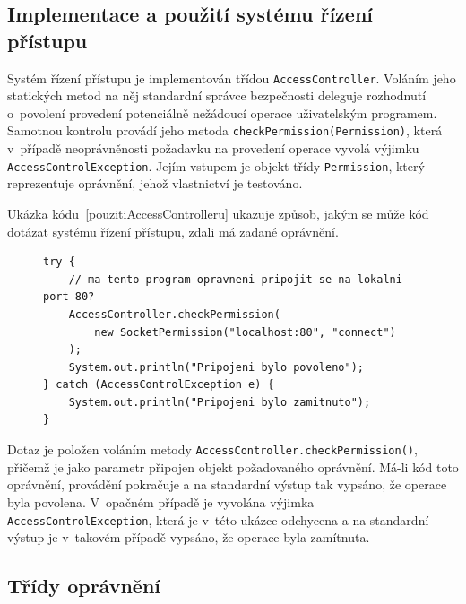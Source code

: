 \subsection{Implementace a použití systému řízení přístupu}\label{implementaceAC}

Systém řízení přístupu je implementován třídou {\tt AccessController}. Voláním jeho statických metod na něj standardní správce bezpečnosti deleguje rozhodnutí o~povolení provedení potenciálně nežádoucí operace uživatelským programem. Samotnou kontrolu provádí jeho metoda {\tt checkPermission(Permission)}, která v~případě neoprávněnosti požadavku na provedení operace vyvolá výjimku {\tt AccessControlException}. Jejím vstupem je objekt třídy {\tt Permission}, který reprezentuje oprávnění, jehož vlastnictví je testováno.~\cite{oaks}

Ukázka kódu~\ref{pouzitiAccessControlleru} ukazuje způsob, jakým se může kód dotázat systému řízení přístupu, zdali má zadané oprávnění.~\cite{oaks}

\begin{figure}[b!]
\begin{lstlisting}[caption=Příklad položení dotazu systému řízení přístupu, label=pouzitiAccessControlleru]
try {
    // ma tento program opravneni pripojit se na lokalni port 80?
    AccessController.checkPermission(
        new SocketPermission("localhost:80", "connect")
    );
    System.out.println("Pripojeni bylo povoleno");
} catch (AccessControlException e) {
    System.out.println("Pripojeni bylo zamitnuto");
}
\end{lstlisting}
\end{figure}

Dotaz je položen voláním metody {\tt AccessController.checkPermission()}, přičemž je jako parametr připojen objekt požadovaného oprávnění.
Má-li kód toto oprávnění, provádění pokračuje a na standardní výstup tak vypsáno, že operace byla povolena.
V~opačném případě je vyvolána výjimka {\tt AccessControlException}, která je v~této ukázce odchycena a na standardní výstup je v~takovém případě vypsáno, že operace byla zamítnuta.

\subsection{Třídy oprávnění}

